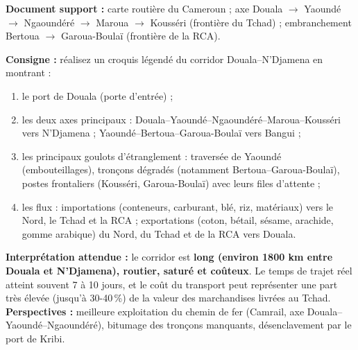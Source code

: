 \documentclass[11pt]{article}
\begin{document}
\begin{experience}
\textbf{Document support :} carte routière du Cameroun ; axe Douala $\rightarrow$ Yaoundé $\rightarrow$ Ngaoundéré $\rightarrow$ Maroua $\rightarrow$ Kousséri (frontière du Tchad) ; embranchement Bertoua $\rightarrow$ Garoua-Boulaï (frontière de la RCA).

\textbf{Consigne :} réalisez un croquis légendé du corridor Douala--N'Djamena en montrant :
\begin{enumerate}
    \item le port de Douala (porte d'entrée) ;
    \item les deux axes principaux : Douala--Yaoundé--Ngaoundéré--Maroua--Kousséri vers N'Djamena ; Yaoundé--Bertoua--Garoua-Boulaï vers Bangui ;
    \item les principaux goulots d'étranglement : traversée de Yaoundé (embouteillages), tronçons dégradés (notamment Bertoua--Garoua-Boulaï), postes frontaliers (Kousséri, Garoua-Boulaï) avec leurs files d'attente ;
    \item les flux : importations (conteneurs, carburant, blé, riz, matériaux) vers le Nord, le Tchad et la RCA ; exportations (coton, bétail, sésame, arachide, gomme arabique) du Nord, du Tchad et de la RCA vers Douala.
\end{enumerate}

\textbf{Interprétation attendue :} le corridor est \textbf{long (environ \num{1800} km entre Douala et N'Djamena), routier, saturé et coûteux}. Le temps de trajet réel atteint souvent \num{7} à \num{10} jours, et le coût du transport peut représenter une part très élevée (jusqu'à \num{30}-\num{40}\,\%) de la valeur des marchandises livrées au Tchad. \textbf{Perspectives :} meilleure exploitation du chemin de fer (Camrail, axe Douala--Yaoundé--Ngaoundéré), bitumage des tronçons manquants, désenclavement par le port de Kribi.
\end{experience}
\end{document}
